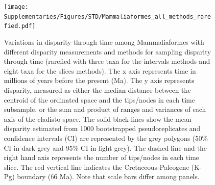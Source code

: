 \begin{landscape}
\begin{figure}[!htbp]
\centering
    \texttt{[image: Supplementaries/Figures/STD/Mammaliaformes\_all\_methods\_rarefied.pdf]}
\caption[Comparison of all the disparity metrics and all the time sampling methods for Mammaliaformes (rarefied)]{Variations in disparity through time among Mammaliaformes with different disparity measurements and methods for sampling disparity through time (rarefied with three taxa for the intervals methods and eight taxa for the slices methods). The x axis represents time in millions of years before the present (Ma). The y axis represents disparity, measured as either the median distance between the centroid of the ordinated space and the tips/nodes in each time subsample, or the sum and product of ranges and variances of each axis of the cladisto-space. The solid black lines show the mean disparity estimated from 1000 bootstrapped pseudoreplicates and confidence intervals (CI) are represented by the grey polygons (50\% CI in dark grey and 95\% CI in light grey). The dashed line and the right hand axis represents the number of tips/nodes in each time slice. The red vertical line indicates the Cretaceous-Paleogene (K-Pg) boundary (66 Ma). Note that scale bars differ among panels.}
\label{Supp_disparity_all_Mammaliaformes_rarefied}
\end{figure}
\end{landscape}

